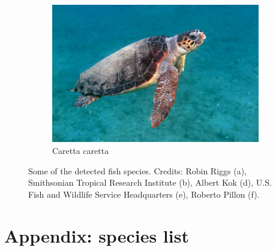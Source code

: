 \documentclass[10pt]{article}
\begin{document}
\begin{figure}[h]
\begin{subfigure}[b]{0.48\textwidth}
         \includegraphics[width=\textwidth]{images/caretta_caretta.jpg}
         \caption{Caretta caretta}
     \end{subfigure}
     \caption{Some of the detected fish species. Credits: Robin Riggs (a), Smithsonian Tropical Research Institute (b), Albert Kok (d), U.S. Fish and Wildlife Service Headquarters (e), Roberto Pillon (f).}
\end{figure}

\clearpage

\section*{Appendix: species list}

\begin{landscape}

\end{landscape}
\end{document}
